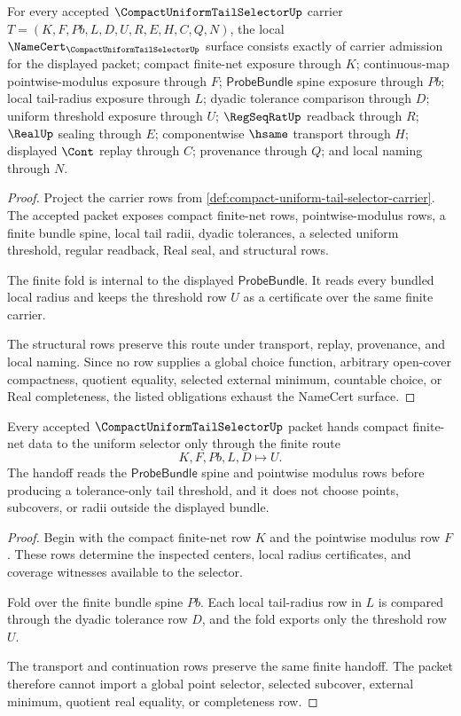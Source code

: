 \begin{theorem}
\label{thm:compact-uniform-tail-selector-namecert-obligations}
For every accepted $\CompactUniformTailSelectorUp$ carrier $T=(K,F,Pb,L,D,U,R,E,H,C,Q,N)$, the local $\NameCert_{\CompactUniformTailSelectorUp}$ surface consists exactly of carrier admission for the displayed packet; compact finite-net exposure through $K$; continuous-map pointwise-modulus exposure through $F$; $\mathsf{ProbeBundle}$ spine exposure through $Pb$; local tail-radius exposure through $L$; dyadic tolerance comparison through $D$; uniform threshold exposure through $U$; $\RegSeqRatUp$ readback through $R$; $\RealUp$ sealing through $E$; componentwise $\hsame$ transport through $H$; displayed $\Cont$ replay through $C$; provenance through $Q$; and local naming through $N$.
\end{theorem}
\begin{proof}
Project the carrier rows from \autoref{def:compact-uniform-tail-selector-carrier}. The accepted packet exposes compact finite-net rows, pointwise-modulus rows, a finite bundle spine, local tail radii, dyadic tolerances, a selected uniform threshold, regular readback, Real seal, and structural rows.

The finite fold is internal to the displayed $\mathsf{ProbeBundle}$. It reads every bundled local radius and keeps the threshold row $U$ as a certificate over the same finite carrier.

The structural rows preserve this route under transport, replay, provenance, and local naming. Since no row supplies a global choice function, arbitrary open-cover compactness, quotient equality, selected external minimum, countable choice, or Real completeness, the listed obligations exhaust the NameCert surface.
\end{proof}

\begin{theorem}
\label{thm:compact-uniform-tail-selector-finite-net-handoff}
Every accepted $\CompactUniformTailSelectorUp$ packet hands compact finite-net data to the uniform selector only through the finite route
$$
K,F,Pb,L,D\longmapsto U.
$$
The handoff reads the $\mathsf{ProbeBundle}$ spine and pointwise modulus rows before producing a tolerance-only tail threshold, and it does not choose points, subcovers, or radii outside the displayed bundle.
\end{theorem}
\begin{proof}
Begin with the compact finite-net row $K$ and the pointwise modulus row $F$. These rows determine the inspected centers, local radius certificates, and coverage witnesses available to the selector.

Fold over the finite bundle spine $Pb$. Each local tail-radius row in $L$ is compared through the dyadic tolerance row $D$, and the fold exports only the threshold row $U$.

The transport and continuation rows preserve the same finite handoff. The packet therefore cannot import a global point selector, selected subcover, external minimum, quotient real equality, or completeness row.
\end{proof}

